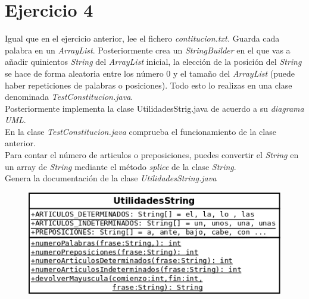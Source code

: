 \documentclass[4paper]{article}
\begin{document}
\section*{Ejercicio 4}
Igual que en el ejercicio anterior, lee el fichero \emph{contitucion.txt.} Guarda cada palabra en un \emph{ArrayList}. Posteriormente crea un \emph{StringBuilder} en el que vas a añadir quinientos \emph{String} del \emph{ArrayList} inicial, la elección de la posición del \emph{String} se hace de forma aleatoria entre los número 0 y el tamaño del \emph{ArrayList} (puede haber repeticiones de palabras o posiciones). Todo esto lo realizas en una clase denominada \emph{TestConstitucion.java}.\\
Posteriormente implementa la clase UtilidadesStrig.java de acuerdo a su \emph{diagrama UML}.\\
En la clase \emph{TestConstitucion.java} comprueba el funcionamiento de la clase anterior.\\
Para contar el número de articulos o preposiciones, puedes convertir el \emph{String} en un array de \emph{String} mediante el método \emph{splice} de la clase \emph{String}.\\
Genera la documentación de la clase \emph{UtilidadesString.java}
\begin{figure}
\includegraphics[scale=0.6]{utilidades.png}
\end{figure}
\end{document}
